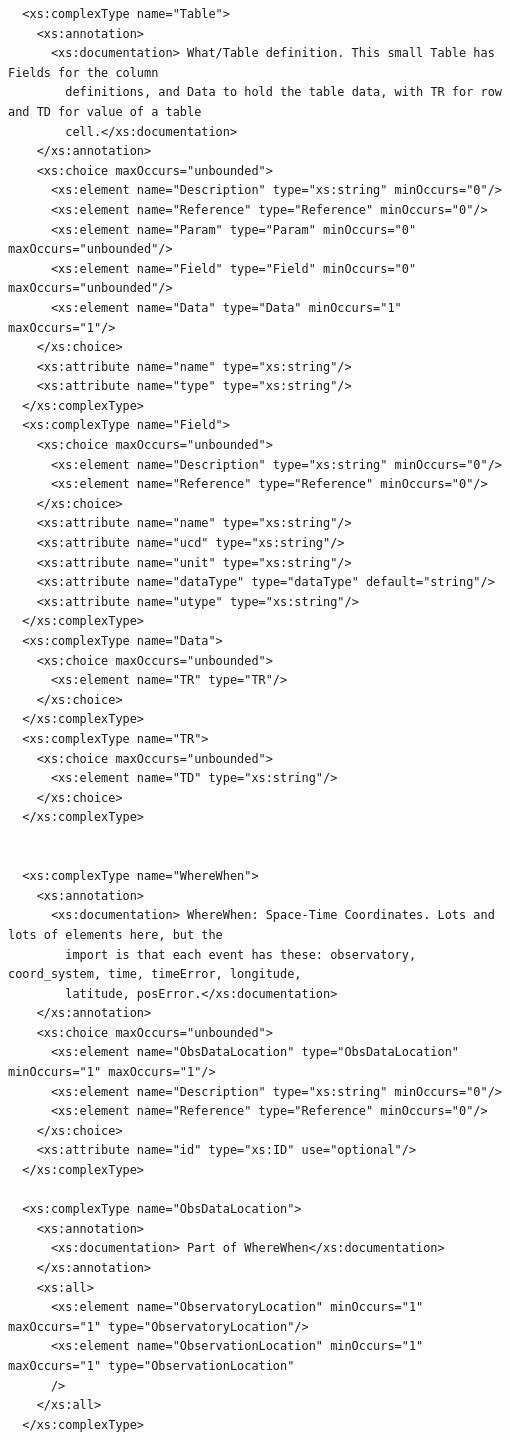 \documentclass[11pt,a4paper]{ivoa}
\begin{document}
{\begin{verbatim}
  <xs:complexType name="Table">
    <xs:annotation>
      <xs:documentation> What/Table definition. This small Table has Fields for the column
        definitions, and Data to hold the table data, with TR for row and TD for value of a table
        cell.</xs:documentation>
    </xs:annotation>
    <xs:choice maxOccurs="unbounded">
      <xs:element name="Description" type="xs:string" minOccurs="0"/>
      <xs:element name="Reference" type="Reference" minOccurs="0"/>
      <xs:element name="Param" type="Param" minOccurs="0" maxOccurs="unbounded"/>
      <xs:element name="Field" type="Field" minOccurs="0" maxOccurs="unbounded"/>
      <xs:element name="Data" type="Data" minOccurs="1" maxOccurs="1"/>
    </xs:choice>
    <xs:attribute name="name" type="xs:string"/>
    <xs:attribute name="type" type="xs:string"/>
  </xs:complexType>
  <xs:complexType name="Field">
    <xs:choice maxOccurs="unbounded">
      <xs:element name="Description" type="xs:string" minOccurs="0"/>
      <xs:element name="Reference" type="Reference" minOccurs="0"/>
    </xs:choice>
    <xs:attribute name="name" type="xs:string"/>
    <xs:attribute name="ucd" type="xs:string"/>
    <xs:attribute name="unit" type="xs:string"/>
    <xs:attribute name="dataType" type="dataType" default="string"/>
    <xs:attribute name="utype" type="xs:string"/>
  </xs:complexType>
  <xs:complexType name="Data">
    <xs:choice maxOccurs="unbounded">
      <xs:element name="TR" type="TR"/>
    </xs:choice>
  </xs:complexType>
  <xs:complexType name="TR">
    <xs:choice maxOccurs="unbounded">
      <xs:element name="TD" type="xs:string"/>
    </xs:choice>
  </xs:complexType>


  <xs:complexType name="WhereWhen">
    <xs:annotation>
      <xs:documentation> WhereWhen: Space-Time Coordinates. Lots and lots of elements here, but the
        import is that each event has these: observatory, coord_system, time, timeError, longitude,
        latitude, posError.</xs:documentation>
    </xs:annotation>
    <xs:choice maxOccurs="unbounded">
      <xs:element name="ObsDataLocation" type="ObsDataLocation" minOccurs="1" maxOccurs="1"/>
      <xs:element name="Description" type="xs:string" minOccurs="0"/>
      <xs:element name="Reference" type="Reference" minOccurs="0"/>
    </xs:choice>
    <xs:attribute name="id" type="xs:ID" use="optional"/>
  </xs:complexType>

  <xs:complexType name="ObsDataLocation">
    <xs:annotation>
      <xs:documentation> Part of WhereWhen</xs:documentation>
    </xs:annotation>
    <xs:all>
      <xs:element name="ObservatoryLocation" minOccurs="1" maxOccurs="1" type="ObservatoryLocation"/>
      <xs:element name="ObservationLocation" minOccurs="1" maxOccurs="1" type="ObservationLocation"
      />
    </xs:all>
  </xs:complexType>


\end{verbatim}}
\end{document}
